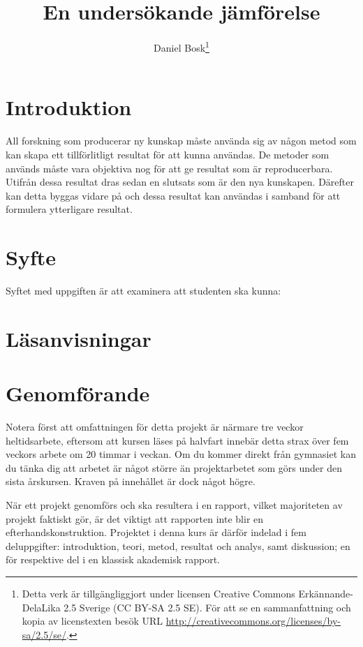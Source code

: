 \documentclass[a4paper]{miunasgn}
\title{En undersökande jämförelse}
\author{Daniel Bosk\thanks{%
	Detta verk är tillgängliggjort under licensen Creative Commons 
	Erkännande-DelaLika 2.5 Sverige (CC BY-SA 2.5 SE).
	För att se en sammanfattning och kopia av licenstexten besök URL 
	\url{http://creativecommons.org/licenses/by-sa/2.5/se/}.
	}
}
\date{\svnId}
\begin{document}
\maketitle
\thispagestyle{foot}
\tableofcontents


\section{Introduktion}
\noindent
All forskning som producerar ny kunskap måste använda sig av någon metod som 
kan skapa ett tillförlitligt resultat för att kunna användas.
De metoder som används måste vara objektiva nog för att ge resultat som är 
reproducerbara.
Utifrån dessa resultat dras sedan en slutsats som är den nya kunskapen.
Därefter kan detta byggas vidare på och dessa resultat kan användas i samband 
för att formulera ytterligare resultat.


\section{Syfte}
\noindent
Syftet med uppgiften är att examinera att studenten ska kunna:
\begin{itemize}
  
\end{itemize}


\section{Läsanvisningar}
\noindent



\section{Genomförande}

Notera först att omfattningen för detta projekt är närmare tre veckor 
heltidsarbete, eftersom att kursen läses på halvfart innebär detta strax över 
fem veckors arbete om 20 timmar i veckan.
Om du kommer direkt från gymnasiet kan du tänka dig att arbetet är något större 
än projektarbetet som görs under den sista årskursen.
Kraven på innehållet är dock något högre.

När ett projekt genomförs och ska resultera i en rapport, vilket majoriteten av 
projekt faktiskt gör, är det viktigt att rapporten inte blir en 
efterhandskonstruktion.
Projektet i denna kurs är därför indelad i fem deluppgifter: introduktion, 
teori, metod, resultat och analys, samt diskussion; en för respektive del i en 
klassisk akademisk rapport.
\end{document}
